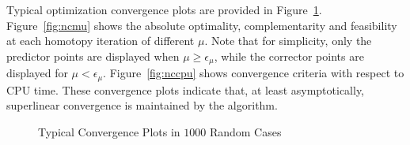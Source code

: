 Typical optimization convergence plots are provided in Figure~\ref{fig:nc_converg}. Figure~\ref{fig:ncmu} 
shows the absolute optimality, complementarity and feasibility at each homotopy iteration of different $\mu$. 
Note that for simplicity, only the predictor points are displayed when $\mu \geq \epsilon_{\mu}$, 
while the corrector points are displayed for $\mu < \epsilon_{\mu}$.
Figure~\ref{fig:nccpu} shows convergence criteria with respect to  CPU time. 
These convergence plots indicate that, at least asymptotically, superlinear convergence is maintained by the algorithm.

\begin{figure}[tbp]
  \centering
   \hspace{1em}
   \caption{Typical Convergence Plots in $1000$ Random Cases \label{fig:nc_converg}}
\end{figure}



